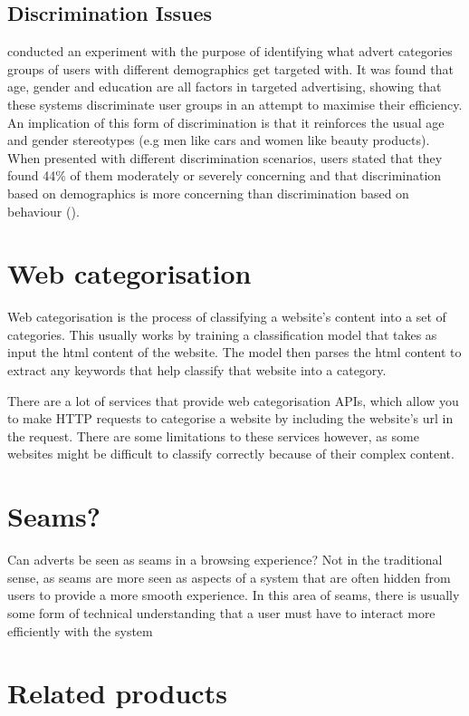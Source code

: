 \documentclass{l4proj}
\begin{document}
\subsection{Discrimination Issues}
\cite{Bol2019a} conducted an experiment with the purpose of identifying what advert categories groups of users with different demographics get targeted with. It was found that age, gender and education are all factors in targeted advertising, showing that these systems discriminate user groups in an attempt to maximise their efficiency. An implication of this form of discrimination is that it reinforces the usual age and gender stereotypes (e.g men like cars and women like beauty products). When presented with different discrimination scenarios, users stated that they found 44\% of them moderately or severely concerning and that discrimination based on demographics is more concerning than discrimination based on behaviour (\cite{Plane2017}).

\section{Web categorisation}
Web categorisation is the process of classifying a website's content into a set of categories. This usually works by training a classification model that takes as input the html content of the website. The model then parses the html content to extract any keywords that help classify that website into a category. 

There are a lot of services that provide web categorisation APIs, which allow you to make HTTP requests to categorise a website by including the website's url in the request. There are some limitations to these services however, as some websites might be difficult to classify correctly because of their complex content.

\section{Seams?}
Can adverts be seen as seams in a browsing experience? Not in the traditional sense, as seams are more seen as aspects of a system that are often hidden from users to provide a more smooth experience. In this area of seams, there is usually some form of technical understanding that a user must have to interact more efficiently with the system

\section{Related products}
\end{document}
